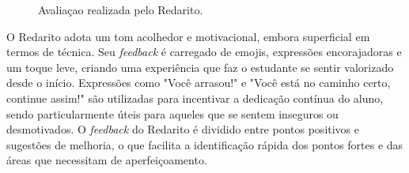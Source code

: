 \documentclass[portuguese]{textolivre}
\begin{document}
\begin{figure}[htbp]
\centering
\begin{minipage}{\textwidth}
 \caption{Avaliaçao realizada pelo Redarito.}
 \label{fig03}
\end{minipage}
\end{figure}

O Redarito adota um tom acolhedor e motivacional, embora superficial em termos de técnica. Seu \textit{feedback} é carregado de emojis, expressões encorajadoras e um toque leve, criando uma experiência que faz o estudante se sentir valorizado desde o início. Expressões como "Você arrasou!" e "Você está no caminho certo, continue assim!" são utilizadas para incentivar a dedicação contínua do aluno, sendo particularmente úteis para aqueles que se sentem inseguros ou desmotivados. O \textit{feedback} do Redarito é dividido entre pontos positivos e sugestões de melhoria, o que facilita a identificação rápida dos pontos fortes e das áreas que necessitam de aperfeiçoamento. 
\end{document}
